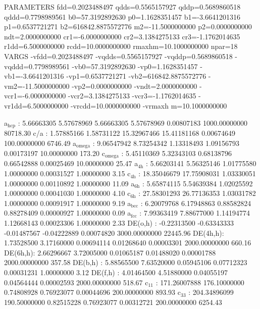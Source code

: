 \documentclass[11pt]{article}
\begin{document}
PARAMETERS
  fdd=0.2023488497 qdds=0.5565157927 qddp=0.5689860518 qddd=0.7798989561 b0=57.3192892630 p0=1.1628351457 b1=-3.6641201316 p1=0.6537721271 b2=616842.8875572776 m2=-11.5000000000 p2=0.0000000000 ndt=2.0000000000 cr1=-6.0000000000 cr2=3.1384275133 cr3=-1.1762014635 r1dd=6.5000000000 rcdd=10.0000000000 rmaxhm=10.1000000000 npar=18 
VARGS
    -vfdd=0.2023488497 -vqdds=0.5565157927 -vqddp=0.5689860518 -vqddd=0.7798989561 -vb0=57.3192892630 -vp0=1.1628351457 -vb1=-3.6641201316 -vp1=0.6537721271 -vb2=616842.8875572776 -vm2=-11.5000000000 -vp2=0.0000000000 -vndt=2.0000000000 -vcr1=-6.0000000000 -vcr2=3.1384275133 -vcr3=-1.1762014635 -vr1dd=6.5000000000 -vrcdd=10.0000000000 -vrmaxh
m=10.1000000000 

a\(_{\text{hcp}}\)   :   5.66663305   5.57678969   5.66663305   5.57678969   0.00807183 1000.00000000     80718.30
c/a     :   1.57885166   1.58731122  15.32967466  15.41181168   0.00674649 100.00000000      6746.49
a\(_{\text{omega}}\) :   9.06547942   8.73254342   1.13318493   1.09156793   0.00173197  10.00000000       173.20
c\(_{\text{omega}}\) :   5.45110369   5.32343103   0.68138796   0.66542888   0.00025469  10.00000000        25.47
a\(_{\text{4h}}\)    :   5.66203141   5.56325146   1.01775580   1.00000000   0.00031527   1.00000000         3.15
c\(_{\text{4h}}\)    :  18.35046679  17.75908031   1.03330051   1.00000000   0.00110892   1.00000000        11.09
a\(_{\text{6h}}\)    :   5.65874115   5.54639384   1.02025592   1.00000000   0.00041030   1.00000000         4.10
c\(_{\text{6h}}\)    :  27.58301293  26.77136353   1.03031782   1.00000000   0.00091917   1.00000000         9.19
a\(_{\text{bcc}}\)   :   6.20079768   6.17948863   0.88582824   0.88278409   0.00000927   1.00000000         0.09
a\(_{\text{fcc}}\)   :   7.99363419   7.88677000   1.14194774   1.12668143   0.00023306   1.00000000         2.33
DE(o,h) :  -0.22313500  -0.63343333  -0.01487567  -0.04222889   0.00074820 3000.00000000     22445.96
DE(4h,h):   1.73528500   3.17160000   0.00694114   0.01268640   0.00003301 2000.00000000       660.16
DE(6h,h):   2.66296667   3.72005000   0.01065187   0.01488020   0.00001788 2000.00000000       357.58
DE(b,h) :   5.88565500   7.63520000   0.05945106   0.07712323   0.00031231   1.00000000         3.12
DE(f,h) :   4.01464500   4.51880000   0.04055197   0.04564444   0.00002593 2000.00000000       518.67
c\(_{\text{11}}\)    : 171.26007888 176.10000000   0.74808928   0.76923077   0.00044696 200.00000000       893.93
c\(_{\text{33}}\)    : 204.34896099 190.50000000   0.82515228   0.76923077   0.00312721 200.00000000      6254.43
\end{document}

